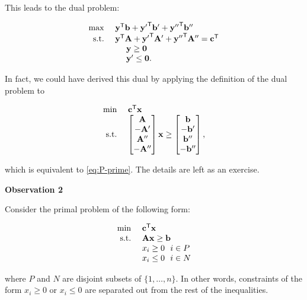 This leads to the dual problem:

\begin{equation}
\begin{array}{rl}
\max~ & \mathbf{y}^{\mathsf{T}}\mathbf{b} 
+\mathbf{y'}^{\mathsf{T}}\mathbf{b'}
+\mathbf{y''}^{\mathsf{T}}\mathbf{b''} \\
\mbox{s.t.} ~
& \mathbf{y}^{\mathsf{T}}\mathbf{A}
+\mathbf{y'}^{\mathsf{T}}\mathbf{A'}
+\mathbf{y''}^{\mathsf{T}}\mathbf{A''} = \mathbf{c}^{\mathsf{T}} \\
&~~~~\mathbf{y} \geq \mathbf{0} \\
&~~~~\mathbf{y'} \leq \mathbf{0}.
\end{array} \label{eq:D-prime}
\end{equation}

In fact, we could have derived this dual by applying the definition of
the dual problem to

\begin{equation*}
\begin{array}{rl}
\min ~& \mathbf{c}^{\mathsf{T}}\mathbf{x} \\
\mbox{s.t.}  ~
& \begin{bmatrix} 
 \mathbf{A} \\
 -\mathbf{A'} \\
 \mathbf{A''} \\
 -\mathbf{A''}
\end{bmatrix} \mathbf{x}
\geq
\begin{bmatrix}
\mathbf{b} \\
-\mathbf{b'} \\
\mathbf{b''} \\
-\mathbf{b''}
\end{bmatrix},
\end{array}
\end{equation*}

which is equivalent to \eqref{eq:P-prime}. The details are left as an
exercise.

\textbf{Observation 2}

Consider the primal problem of the following form:

\begin{equation}
\begin{array}{rl}
\min ~& \mathbf{c}^{\mathsf{T}}\mathbf{x} \\
\mbox{s.t.} ~& \mathbf{A}\mathbf{x} \geq \mathbf{b} \\
 & x_i \geq 0 ~~i \in P \\
 & x_i \leq 0 ~~i \in N 
\end{array}\label{eq:P-dbl-prime}
\end{equation}

where \(P\) and \(N\) are disjoint subsets of \(\{1,\ldots,n\}\). In
other words, constraints of the form \(x_i \geq 0\) or \(x_i \leq 0\)
are separated out from the rest of the inequalities.

